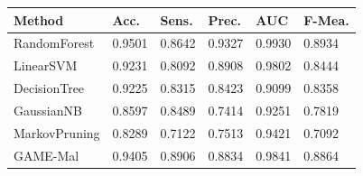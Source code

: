 \begin{tabular}{llllll}
\toprule
Method & Acc. & Sens. & Prec. & AUC & F-Mea. \\
\midrule
RandomForest & 0.9501 & 0.8642 & 0.9327 & 0.9930 & 0.8934 \\
LinearSVM & 0.9231 & 0.8092 & 0.8908 & 0.9802 & 0.8444 \\
DecisionTree & 0.9225 & 0.8315 & 0.8423 & 0.9099 & 0.8358 \\
GaussianNB & 0.8597 & 0.8489 & 0.7414 & 0.9251 & 0.7819 \\
MarkovPruning & 0.8289 & 0.7122 & 0.7513 & 0.9421 & 0.7092 \\
GAME-Mal & 0.9405 & 0.8906 & 0.8834 & 0.9841 & 0.8864 \\
\bottomrule
\end{tabular}

